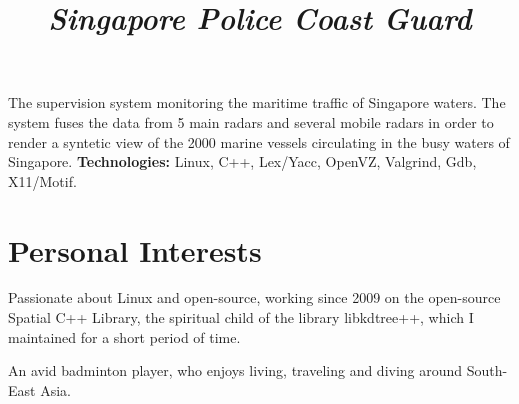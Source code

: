 \documentclass[overlapped,line,letterpaper]{res}
\begin{document}
\begin{resume}
  \title{\em Singapore Police Coast Guard}
  \begin{position}
    The supervision system monitoring the maritime traffic of
    Singapore waters. The system fuses the data from 5 main radars and
    several mobile radars in order to render a syntetic view of the 2000
    marine vessels circulating in the busy waters of Singapore.
    \newline
    {\bf Technologies:} Linux, C++, Lex/Yacc, OpenVZ, Valgrind, Gdb, X11/Motif.
  \end{position}



  \section{\bf Personal Interests}

  Passionate about Linux and open-source, working since 2009 on the
  open-source Spatial C++ Library, the spiritual child of the library
  libkdtree++, which I maintained for a short period of time.

  An avid badminton player, who enjoys living, traveling and diving around
  South-East Asia.



\end{resume}
\end{document}

